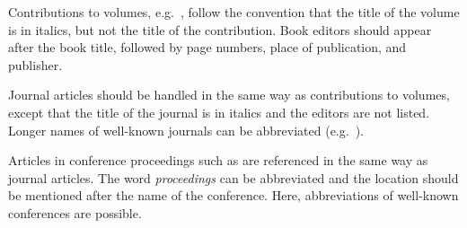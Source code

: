 \documentclass[12pt]{article}
\begin{document}
Contributions to volumes, e.g.~, follow the
convention that the title of the volume is in italics, but not the
title of the contribution. Book editors should appear after the book title, 
followed by page numbers, place of publication, and publisher.

Journal articles should be handled in the same way as contributions to
volumes, except that the title of the journal is in italics and
the editors are not listed. Longer names of well-known journals can be
abbreviated (e.g.~).

Articles in conference proceedings such as  are
referenced in the same way as journal articles.  The word
\textit{proceedings} can be abbreviated and the location should be
mentioned after the name of the conference. Here, abbreviations of
well-known conferences are possible.



\end{document}
